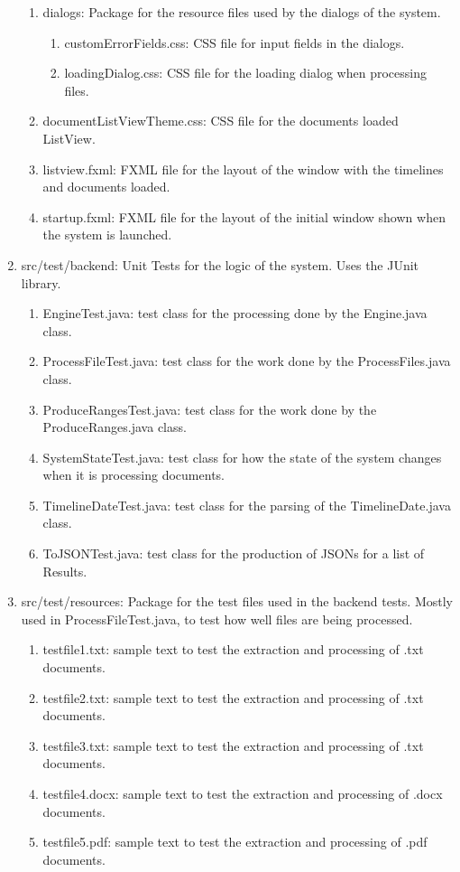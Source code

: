 \begin{enumerate}
\begin{enumerate}
		\item dialogs: Package for the resource files used by the dialogs of the system.
		\begin{enumerate}
			\item customErrorFields.css: CSS file for input fields in the dialogs.
			\item loadingDialog.css: CSS file for the loading dialog when processing files.
		\end{enumerate}
		\item documentListViewTheme.css: CSS file for the documents loaded ListView.
		\item listview.fxml: FXML file for the layout of the window with the timelines and documents loaded.
		\item startup.fxml: FXML file for the layout of the initial window shown when the system is launched.
	\end{enumerate}
	\item src/test/backend: Unit Tests for the logic of the system. Uses the JUnit library.
	\begin{enumerate}
		\item EngineTest.java: test class for the processing done by the Engine.java class.
		\item ProcessFileTest.java: test class for the work done by the ProcessFiles.java class.
		\item ProduceRangesTest.java: test class for the work done by the ProduceRanges.java class.
		\item SystemStateTest.java: test class for how the state of the system changes when it is processing documents.
		\item TimelineDateTest.java: test class for the parsing of the TimelineDate.java class.
		\item ToJSONTest.java: test class for the production of JSONs for a list of Results.
	\end{enumerate}
	\item src/test/resources: Package for the test files used in the backend tests. Mostly used in ProcessFileTest.java, to test how well files are being processed.
	\begin{enumerate}
	\item testfile1.txt: sample text to test the extraction and processing of .txt documents. 
	\item testfile2.txt: sample text to test the extraction and processing of .txt documents. 
	\item testfile3.txt: sample text to test the extraction and processing of .txt documents. 
	\item testfile4.docx: sample text to test the extraction and processing of .docx documents. 
	\item testfile5.pdf: sample text to test the extraction and processing of .pdf documents. 
	\end{enumerate}
\end{enumerate}

